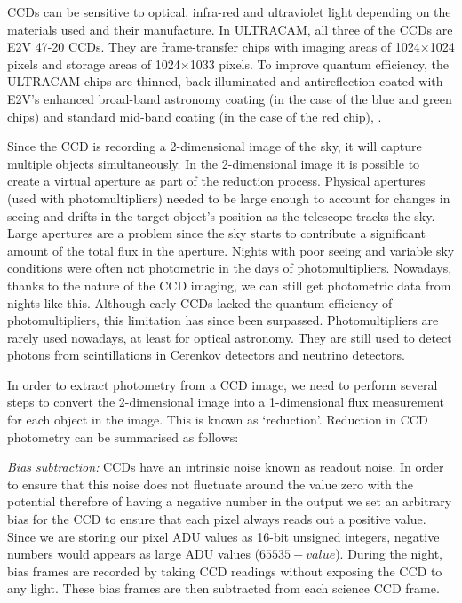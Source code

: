 CCDs can be sensitive to optical, infra-red and ultraviolet light depending on the materials used and their manufacture. In ULTRACAM, all three of the CCDs are E2V 47-20 CCDs. They are frame-transfer chips with imaging areas of 1024$\times$1024 pixels and storage areas of 1024$\times$1033 pixels.  To improve quantum efficiency, the ULTRACAM chips are thinned, back-illuminated and antireflection coated with E2V's enhanced broad-band astronomy coating (in the case of the blue and green chips) and standard mid-band coating (in the case of the red chip), \citep{dhillon07}.

Since the CCD is recording a 2-dimensional image of the sky, it will capture multiple objects simultaneously. In the 2-dimensional image it is possible to create a virtual aperture as part of the reduction process. Physical apertures (used with photomultipliers) needed to be large enough to account for changes in seeing and drifts in the target object's position as the telescope tracks the sky. Large apertures are a problem since the sky starts to contribute a significant amount of the total flux in the aperture. Nights with poor seeing and variable sky conditions were often not photometric in the days of photomultipliers. Nowadays, thanks to the nature of the CCD imaging, we can still get photometric data from nights like this.  Although early CCDs lacked the quantum efficiency of photomultipliers, this limitation has since been surpassed. Photomultipliers are rarely used nowadays, at least for optical astronomy. They are still used to detect photons from scintillations in Cerenkov detectors and neutrino detectors.  

In order to extract photometry from a CCD image, we need to perform several steps to convert the 2-dimensional image into a 1-dimensional flux measurement for each object in the image. This is known as `reduction'. Reduction in CCD photometry can be summarised as follows: 

\emph{Bias subtraction:}
CCDs have an intrinsic noise known as readout noise. In order to ensure that this noise does not fluctuate around the value zero with the potential therefore of having a negative number in the output we set an arbitrary bias for the CCD to ensure that each pixel always reads out a positive value. Since we are storing our pixel ADU values as 16-bit unsigned integers, negative numbers would appears as large ADU values ($65535 - value$). During the night, bias frames are recorded by taking CCD readings without exposing the CCD to any light. These bias frames are then subtracted from each science CCD frame. 

